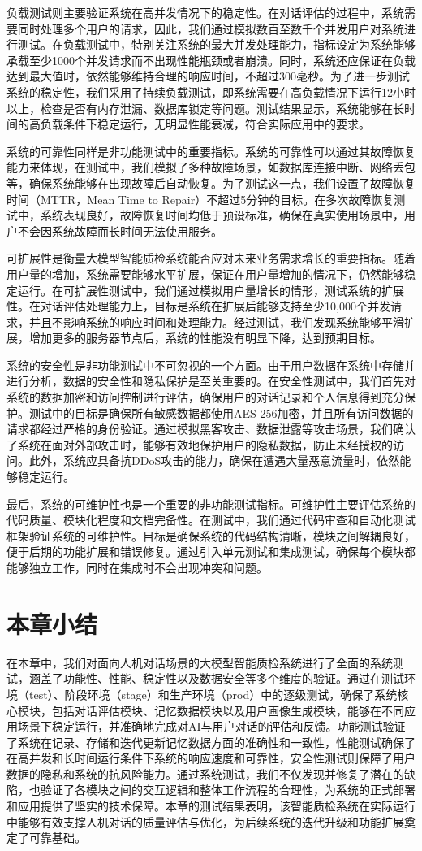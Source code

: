 负载测试则主要验证系统在高并发情况下的稳定性。在对话评估的过程中，系统需要同时处理多个用户的请求，因此，我们通过模拟数百至数千个并发用户对系统进行测试。在负载测试中，特别关注系统的最大并发处理能力，指标设定为系统能够承载至少1000个并发请求而不出现性能瓶颈或者崩溃。同时，系统还应保证在负载达到最大值时，依然能够维持合理的响应时间，不超过300毫秒。为了进一步测试系统的稳定性，我们采用了持续负载测试，即系统需要在高负载情况下运行12小时以上，检查是否有内存泄漏、数据库锁定等问题。测试结果显示，系统能够在长时间的高负载条件下稳定运行，无明显性能衰减，符合实际应用中的要求。

系统的可靠性同样是非功能测试中的重要指标。系统的可靠性可以通过其故障恢复能力来体现，在测试中，我们模拟了多种故障场景，如数据库连接中断、网络丢包等，确保系统能够在出现故障后自动恢复。为了测试这一点，我们设置了故障恢复时间（MTTR，Mean Time to Repair）不超过5分钟的目标。在多次故障恢复测试中，系统表现良好，故障恢复时间均低于预设标准，确保在真实使用场景中，用户不会因系统故障而长时间无法使用服务。

可扩展性是衡量大模型智能质检系统能否应对未来业务需求增长的重要指标。随着用户量的增加，系统需要能够水平扩展，保证在用户量增加的情况下，仍然能够稳定运行。在可扩展性测试中，我们通过模拟用户量增长的情形，测试系统的扩展性。在对话评估处理能力上，目标是系统在扩展后能够支持至少10,000个并发请求，并且不影响系统的响应时间和处理能力。经过测试，我们发现系统能够平滑扩展，增加更多的服务器节点后，系统的性能没有明显下降，达到预期目标。

系统的安全性是非功能测试中不可忽视的一个方面。由于用户数据在系统中存储并进行分析，数据的安全性和隐私保护是至关重要的。在安全性测试中，我们首先对系统的数据加密和访问控制进行评估，确保用户的对话记录和个人信息得到充分保护。测试中的目标是确保所有敏感数据都使用AES-256加密，并且所有访问数据的请求都经过严格的身份验证。通过模拟黑客攻击、数据泄露等攻击场景，我们确认了系统在面对外部攻击时，能够有效地保护用户的隐私数据，防止未经授权的访问。此外，系统应具备抗DDoS攻击的能力，确保在遭遇大量恶意流量时，依然能够稳定运行。

最后，系统的可维护性也是一个重要的非功能测试指标。可维护性主要评估系统的代码质量、模块化程度和文档完备性。在测试中，我们通过代码审查和自动化测试框架验证系统的可维护性。目标是确保系统的代码结构清晰，模块之间解耦良好，便于后期的功能扩展和错误修复。通过引入单元测试和集成测试，确保每个模块都能够独立工作，同时在集成时不会出现冲突和问题。
\section{本章小结}
在本章中，我们对面向人机对话场景的大模型智能质检系统进行了全面的系统测试，涵盖了功能性、性能、稳定性以及数据安全等多个维度的验证。通过在测试环境（test）、阶段环境（stage）和生产环境（prod）中的逐级测试，确保了系统核心模块，包括对话评估模块、记忆数据模块以及用户画像生成模块，能够在不同应用场景下稳定运行，并准确地完成对AI与用户对话的评估和反馈。功能测试验证了系统在记录、存储和迭代更新记忆数据方面的准确性和一致性，性能测试确保了在高并发和长时间运行条件下系统的响应速度和可靠性，安全性测试则保障了用户数据的隐私和系统的抗风险能力。通过系统测试，我们不仅发现并修复了潜在的缺陷，也验证了各模块之间的交互逻辑和整体工作流程的合理性，为系统的正式部署和应用提供了坚实的技术保障。本章的测试结果表明，该智能质检系统在实际运行中能够有效支撑人机对话的质量评估与优化，为后续系统的迭代升级和功能扩展奠定了可靠基础。